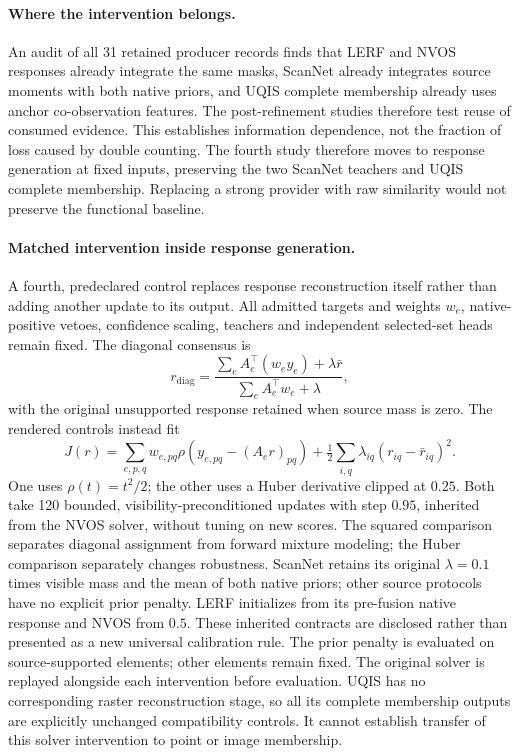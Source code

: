\documentclass[10pt]{article}
\begin{document}
\paragraph{Where the intervention belongs.}
An audit of all 31 retained producer records finds that LERF and NVOS responses
already integrate the same masks, ScanNet already integrates source moments with
both native priors, and UQIS complete membership already uses anchor co-observation
features. The post-refinement studies therefore test reuse of consumed evidence.
This establishes information dependence, not the fraction of loss caused by
double counting. The fourth study therefore moves to response generation at
fixed inputs, preserving the two ScanNet teachers and UQIS complete
membership. Replacing a strong provider with raw similarity would not preserve
the functional baseline.

\paragraph{Matched intervention inside response generation.}
A fourth, predeclared control replaces response reconstruction itself rather
than adding another update to its output. All admitted targets and weights
$w_e$, native-positive vetoes, confidence scaling, teachers and independent
selected-set heads remain fixed. The diagonal consensus is
\begin{equation}
 r_{\mathrm{diag}}=
 \frac{\sum_e A_e^\top(w_e y_e)+\lambda\bar r}
 {\sum_e A_e^\top w_e+\lambda},
\end{equation}
with the original unsupported response retained when source mass is zero.
The rendered controls instead fit
\begin{equation}
 J(r)=\sum_{e,p,q}w_{e,pq}\rho\!\left(y_{e,pq}-(A_er)_{pq}\right)
       +\tfrac12\sum_{i,q}\lambda_{iq}(r_{iq}-\bar r_{iq})^2.
\end{equation}
One uses $\rho(t)=t^2/2$; the other uses a Huber derivative clipped at $0.25$.
Both take 120 bounded, visibility-preconditioned updates with step $0.95$,
inherited from the NVOS solver, without tuning on new scores. The squared
comparison separates diagonal assignment from forward mixture modeling;
the Huber comparison separately changes robustness. ScanNet retains its
original $\lambda=0.1$ times visible mass and the mean of both native priors;
other source protocols have no explicit prior penalty. LERF initializes from
its pre-fusion native response and NVOS from $0.5$. These inherited contracts
are disclosed rather than presented as a new universal calibration rule.
The prior penalty is evaluated on source-supported elements; other elements
remain fixed. The original solver is replayed alongside each intervention before evaluation.
UQIS has no corresponding raster reconstruction stage, so all its complete
membership outputs are explicitly unchanged compatibility controls. It cannot
establish transfer of this solver intervention to point or image membership.
\end{document}
